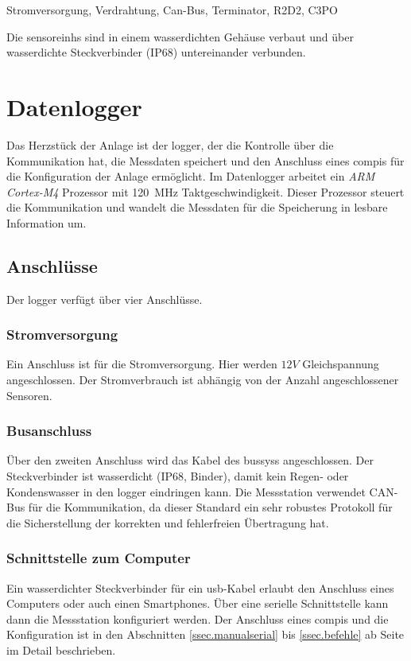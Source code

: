 
Stromversorgung, Verdrahtung, Can-Bus, Terminator, R2D2, C3PO

Die \glspl{sensoreinh} sind in einem wasserdichten Gehäuse verbaut und über wasserdichte Steckverbinder (IP68) untereinander verbunden. 










\section{Datenlogger}\label{sec.manuallogger}
Das Herzstück der Anlage ist der \gls{logger}, der die Kontrolle über die Kommunikation hat, die Messdaten speichert und den Anschluss eines \gls{compi}s für die Konfiguration der Anlage ermöglicht. Im Datenlogger arbeitet ein \emph{ARM Cortex-M4} Prozessor mit 120~MHz Taktgeschwindigkeit. Dieser Prozessor steuert die Kommunikation und wandelt die Messdaten für die Speicherung in lesbare Information um.

\subsection{Anschlüsse}
Der \gls{logger} verfügt über vier Anschlüsse. 


\subsubsection{Stromversorgung}
Ein Anschluss ist für die Stromversorgung. Hier werden \ensuremath{12 V} Gleichspannung angeschlossen. Der Stromverbrauch ist abhängig von der Anzahl angeschlossener Sensoren.


\subsubsection{Busanschluss}
Über den zweiten Anschluss wird das Kabel des \gls{bussys}s angeschlossen. Der Steckverbinder ist wasserdicht (IP68, Binder), damit kein Regen- oder Kondenswasser in den \gls{logger} eindringen kann. Die Messstation verwendet CAN-Bus für die Kommunikation, da dieser Standard ein sehr robustes Protokoll für die Sicherstellung der korrekten und fehlerfreien Übertragung hat. 

\subsubsection{Schnittstelle zum Computer}
Ein wasserdichter Steckverbinder für ein \gls{usb}-Kabel erlaubt den Anschluss eines Computers oder auch einen Smartphones. Über eine serielle Schnittstelle kann dann die Messstation konfiguriert werden. Der Anschluss eines \gls{compi}s und die Konfiguration ist in den Abschnitten \ref{ssec.manualserial} bis \ref{ssec.befehle} ab Seite \pageref{ssec.manualserial} im Detail beschrieben.

